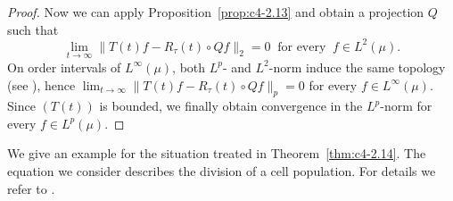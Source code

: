 \begin{proof}
Now we can apply Proposition~\ref{prop:c4-2.13} and obtain a projection $Q$ such that 
\[ 
\lim_{t \to \infty}\|T(t)f - R_{\tau}(t) \circ Qf\|_{2} = 0 \ \text{ for every 
} \ f \in L^{2}(\mu) .
\]
On order intervals of\/ $L^{\infty}(\mu)$, both $L^{p}$- and $L^{2}$-norm induce the same topology (see \textcite[V.8.3]{schaefer:1974}), 
hence $\lim_{t \to \infty} \|T(t)f - R_{\tau}(t) \circ Qf\|_{p} = 0$ for every $f \in L^{\infty}(\mu)$.
Since $(T(t))$ is bounded, we finally obtain convergence in the $L^{p}$-norm for every $f \in L^{p}(\mu)$.
\end{proof}
%
We give an example for the situation treated in Theorem~\ref{thm:c4-2.14}.
The equation we consider describes the division of a cell population.
For details we refer to \textcite{diekmannetal:1984}.
